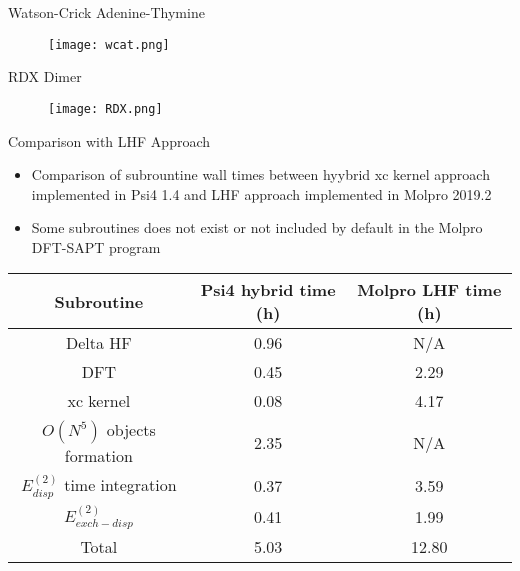 \documentclass{beamer}
\begin{document}
        \begin{frame}{Watson-Crick Adenine-Thymine}
            \begin{figure}
                \centering
                \texttt{[image: wcat.png]}
            \end{figure}
        \end{frame}

        \begin{frame}{RDX Dimer}
            \begin{figure}
                \centering
                \texttt{[image: RDX.png]}
            \end{figure}
        \end{frame}

        \begin{frame}{Comparison with LHF Approach}
            \begin{itemize}
                \item Comparison of subrountine wall times between hyybrid xc kernel approach implemented in Psi4 1.4 and LHF approach implemented in Molpro 2019.2
                \item Some subroutines does not exist or not included by default in the Molpro DFT-SAPT program
            \end{itemize}
            \begin{table}
                \centering
                \begin{tabular}{c c c}
                    \hline
                    Subroutine & Psi4 hybrid time (h) & Molpro LHF time (h) \\ \hline
                    Delta HF & 0.96 & N/A \\ 
                    DFT & 0.45 & 2.29 \\ 
                    xc kernel & 0.08 & 4.17 \\ 
                    $O(N^5)$ objects formation & 2.35 & N/A \\ 
                    $E^{(2)}_{disp}$ time integration & 0.37 & 3.59 \\ 
                    $E^{(2)}_{exch-disp}$ & 0.41 & 1.99 \\ 
                    Total & 5.03 & 12.80 \\ \hline
                \end{tabular}
            \end{table}
        \end{frame}
\end{document}
